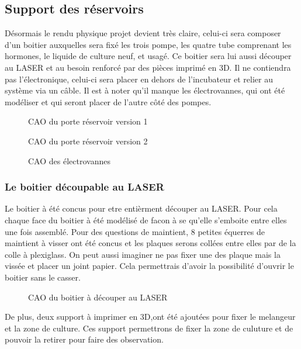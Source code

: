 \documentclass[a4paper, 11pt]{article}
\begin{document}
\subsection{Support des réservoirs}
Désormais le rendu physique projet devient très claire,
celui-ci sera composer d'un boitier auxquelles sera fixé les trois pompe,
les quatre tube comprenant les hormones, le liquide de culture neuf, et usagé.
Ce boitier sera lui aussi découper au LASER et au besoin renforcé par des pièces
imprimé en 3D.
Il ne contiendra pas l'électronique, celui-ci sera placer en dehors de l'incubateur
et relier au système via un câble.
Il est à noter qu'il manque les électrovannes, qui ont été modéliser et qui seront
placer de l'autre côté des pompes.
\begin{multicols}{2}
    \begin{figure}[H]
        \centering
        \caption{CAO du porte réservoir version 1}
        \label{fig:CAO_reservoir1}
    \end{figure}
    \begin{figure}[H]
        \centering
        \caption{CAO du porte réservoir version 2}
        \label{fig:CAO_reservoir2}
    \end{figure}
\end{multicols}
\begin{figure}[H]
    \centering
    \caption{CAO des électrovannes}
    \label{fig:CAO_electrovanne}
\end{figure}
\subsubsection{Le boitier découpable au LASER}
Le boitier à été concus pour etre entièrment découper au LASER. Pour cela chaque face du boitier à été modélisé de facon à se qu'elle s'emboite entre elles une fois assemblé.
Pour des questions de maintient, 8 petites équerres de maintient à visser ont été concus
et les plaques serons collées entre elles par de la colle à plexiglass.
On peut aussi imaginer ne pas fixer une des plaque mais la vissée et placer un joint papier.
Cela permettrais d'avoir la possibilité d'ouvrir le boitier sans le casser.
\begin{figure}[H]
    \centering
    \caption{CAO du boitier à découper au LASER}
    \label{fig:CAO_boitier_decoupe_LASER}
\end{figure}
De plus, deux support à imprimer en 3D,ont été ajoutées pour fixer le melangeur et
la zone de culture.
Ces support permettrons de fixer la zone de culuture et de pouvoir la retirer pour
faire des observation.
\end{document}
